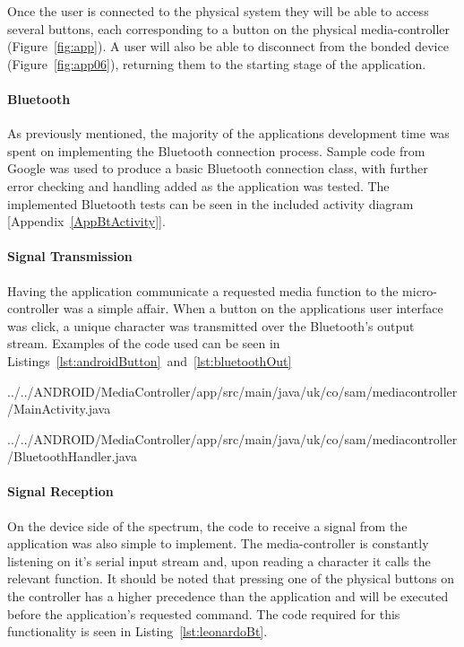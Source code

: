 \documentclass{article}
\begin{document}
			Once the user is connected to the physical system they will be able to access several buttons, each corresponding to a button on the physical media-controller 	(Figure~\ref{fig:app}). A user will also be able to disconnect from the bonded device (Figure~\ref{fig:app06}), returning them to the starting stage of the application.
			
			\paragraph{Bluetooth}
			As previously mentioned, the majority of the applications development time was spent on implementing the Bluetooth connection process. Sample code from Google \cite{GoogleBluetooth:online} was used to produce a basic Bluetooth connection class, with further error checking and handling added as the application was tested. The implemented Bluetooth tests can be seen in the included activity diagram [Appendix~\ref{AppBtActivity}].
			
			\paragraph{Signal Transmission}
			Having the application communicate a requested media function to the micro-controller was a simple affair. When a button on the applications user interface was click, a unique character was transmitted over the Bluetooth's output stream. Examples of the code used can be seen in Listings~\ref{lst:androidButton}~and~\ref{lst:bluetoothOut}
			
			 {../../ANDROID/MediaController/app/src/main/java/uk/co/sam/mediacontroller/MainActivity.java}
			
			 {../../ANDROID/MediaController/app/src/main/java/uk/co/sam/mediacontroller/BluetoothHandler.java}
			
			\paragraph{Signal Reception}
			On the device side of the spectrum, the code to receive a signal from the application was also simple to implement. The media-controller is constantly listening on it's serial input stream and, upon reading a character it calls the relevant function. It should be noted that pressing one of the physical buttons on the controller has a higher precedence than the application and will be executed before the application's requested command. The code required for this functionality is seen in Listing~\ref{lst:leonardoBt}.
			
\end{document}
